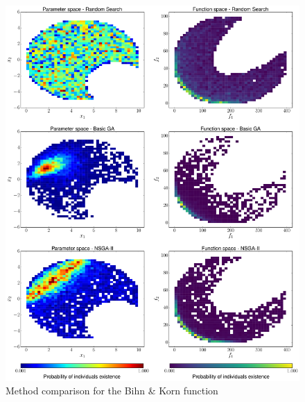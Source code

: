     \begin{figure}[H]
        \centering
        \includegraphics[height=0.96\textheight, width=\textwidth]{Figures/3/hist_BK.pdf}
        \caption{Method comparison for the Bihn \& Korn function}
        \label{fig:histogramBK}
    \end{figure}
    
\newpage

